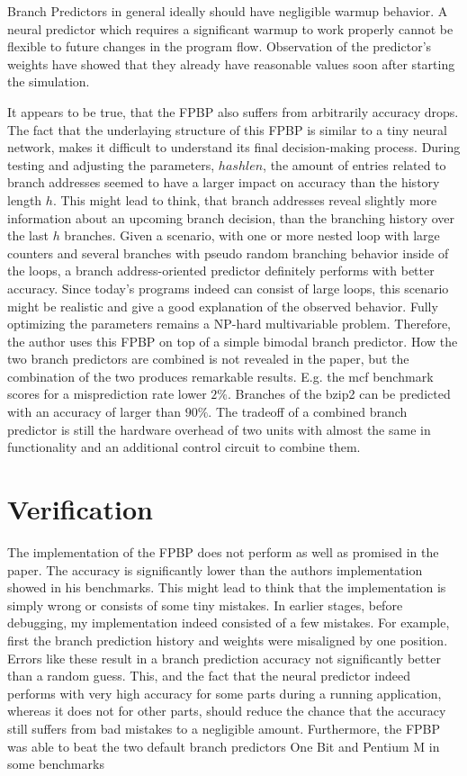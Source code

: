 \documentclass{article}
\begin{document}
Branch Predictors in general ideally should have negligible warmup behavior. A neural predictor which requires a significant warmup to work properly cannot be flexible to future changes in the program flow. 
Observation of the predictor's weights have showed that they already have reasonable values soon after starting the simulation. 

It appears to be true, that the FPBP also suffers from arbitrarily accuracy drops.
The fact that the underlaying structure of this FPBP is similar to a tiny neural network, makes it difficult to understand its final decision-making process. During testing and adjusting the parameters, $hashlen$, the amount of entries related to branch addresses seemed to have a larger impact on accuracy than the history length $h$. This might lead to think, that branch addresses reveal slightly more information about an upcoming branch decision, than the branching history over the last $h$ branches. Given a scenario, with one or more nested loop with large counters and several branches with pseudo random branching behavior inside of the loops, a branch address-oriented predictor definitely performs with better accuracy. Since today's programs indeed can consist of large loops, this scenario might be realistic and give a good explanation of the observed behavior. 
Fully optimizing the parameters remains a NP-hard multivariable problem. Therefore, the author uses this FPBP on top of a simple bimodal branch predictor. How the two branch predictors are combined is not revealed in the paper, but the combination of the two produces remarkable results.
E.g. the \textsf{mcf} benchmark scores for a misprediction rate lower $2\si{\percent}$. Branches of the \textsf{bzip2} can be predicted with an accuracy of larger than $90\si{\percent}$.
The tradeoff of a combined branch predictor is still the hardware overhead of two units with almost the same in functionality and an additional control circuit to combine them.

\section{Verification}
The implementation of the FPBP does not perform as well as promised in the paper. The accuracy is significantly lower than the authors implementation showed in his benchmarks. This might lead to think that the implementation is simply wrong or consists of some tiny mistakes. 
In earlier stages, before debugging, my implementation indeed consisted of a few mistakes. For example, first the branch prediction history and weights were misaligned by one position. Errors like these result in a branch prediction accuracy not significantly better than a random guess. This, and the fact that the neural predictor indeed performs with very high accuracy for some parts during a running application, whereas it does not for other parts, should reduce the chance that the accuracy still suffers from bad mistakes to a negligible amount. Furthermore, the FPBP was able to beat the two default branch predictors One Bit and Pentium M in some benchmarks


\end{document}
